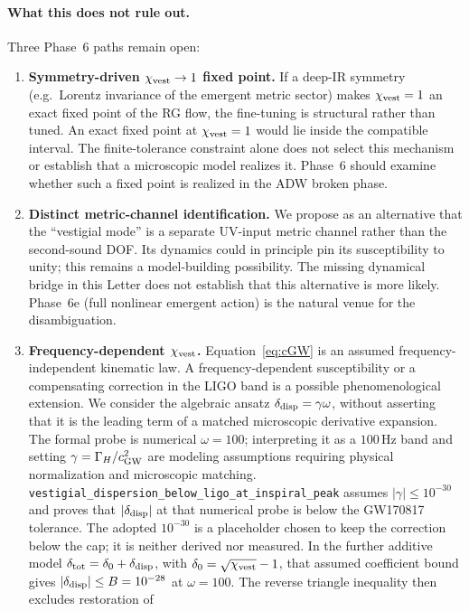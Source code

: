 \documentclass[aps,prl,reprint,nofootinbib,superscriptaddress]{revtex4-2}
\newcommand{\cGW}{c_{\rm GW}}
\newcommand{\chivest}{\chi_{\rm vest}}
\begin{document}
\paragraph{What this does not rule out.} Three Phase~6 paths remain
open:
\begin{enumerate}
\item \textbf{Symmetry-driven $\chivest \to 1$ fixed point.} If a
deep-IR symmetry (e.g.\ Lorentz invariance of the emergent metric
sector) makes $\chivest = 1$ an exact fixed point of the RG flow, the
fine-tuning is structural rather than tuned. An exact fixed point at $\chivest=1$ would lie inside the compatible
interval. The finite-tolerance constraint alone does not select this
mechanism or establish that a microscopic model realizes it.
Phase~6 should examine whether such a fixed point is realized in the
ADW broken phase.
\item \textbf{Distinct metric-channel identification.} We propose as an
alternative that the ``vestigial mode'' is a separate UV-input metric
channel rather than the second-sound DOF.
Its dynamics could in principle pin its susceptibility to unity;
this remains a model-building possibility. The missing dynamical
bridge in this Letter does not establish that this alternative is
more likely. Phase~6e (full nonlinear emergent action) is the natural
venue for the disambiguation.
\item \textbf{Frequency-dependent $\chivest$.} Equation~\eqref{eq:cGW} is
an assumed frequency-independent kinematic law.
A frequency-dependent susceptibility or a compensating correction
in the LIGO band is a possible phenomenological extension.
We consider the algebraic ansatz $\delta_{\rm disp}=\gamma\omega$,
without asserting that it is the leading term of a matched
microscopic derivative expansion.
The formal probe is numerical $\omega=100$; interpreting it as a
$100\,\mathrm{Hz}$ band and setting $\gamma=\Gamma_H/\cGW^2$ are
modeling assumptions requiring physical normalization and
microscopic matching.
\texttt{vestigial\_dispersion\_below\_ligo\_at\_inspiral\_peak}
assumes $|\gamma|\leq10^{-30}$ and proves that
$|\delta_{\rm disp}|$ at that numerical probe is below the
GW170817 tolerance.
The adopted $10^{-30}$ is a placeholder chosen to keep the
correction below the cap; it is neither derived nor measured.
In the further additive model
$\delta_{\rm tot}=\delta_0+\delta_{\rm disp}$, with
$\delta_0=\sqrt{\chivest}-1$, that assumed coefficient bound gives
$|\delta_{\rm disp}|\leq B=10^{-28}$ at $\omega=100$.
The reverse triangle inequality then excludes restoration of

\end{enumerate}
\end{document}
